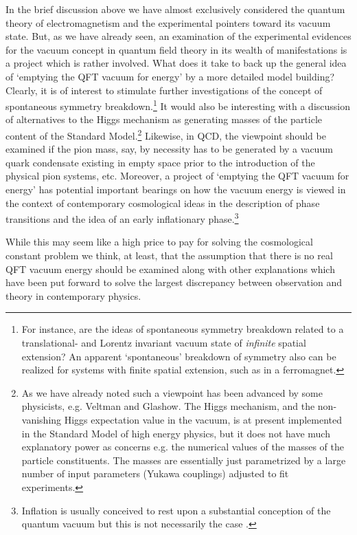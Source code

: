 \documentclass[12pt]{article}
\begin{document}
In the brief discussion above we have almost exclusively
considered the quantum theory of electromagnetism and the
experimental pointers toward its vacuum state. But, as we have
already seen, an examination of the experimental evidences for the
vacuum concept in quantum field theory in its wealth of
manifestations is a project which is rather involved. What does it
take to back up the general idea of `emptying the QFT vacuum for
energy' by a more detailed model building? Clearly, it is of
interest to stimulate further investigations of the concept of
spontaneous symmetry breakdown.\footnote{For instance, are the
ideas of spontaneous symmetry breakdown related to a
translational- and Lorentz invariant vacuum state of {\em
infinite} spatial extension? An apparent `spontaneous' breakdown
of symmetry also can be realized for systems with finite spatial
extension, such as in a ferromagnet.} It would also be interesting
with a discussion of alternatives to the Higgs mechanism as
generating masses of the particle content of the Standard
Model.\footnote{As we have already noted such a viewpoint has been
advanced by some physicists, e.g. Veltman and Glashow. The Higgs
mechanism, and the non-vanishing Higgs expectation value in the
vacuum, is at present implemented in the Standard Model of high
energy physics, but it does not have much explanatory power as
concerns e.g. the numerical values of the masses of the particle
constituents. The masses are essentially just parametrized by a
large number of input parameters (Yukawa couplings) adjusted to
fit experiments.} Likewise, in QCD, the viewpoint should be
examined if the pion mass, say, by necessity has to be generated
by a vacuum quark condensate existing in empty space prior to the
introduction of the physical pion systems, etc. Moreover, a
project of `emptying the QFT vacuum for energy' has potential
important bearings on how the vacuum energy is viewed in the
context of contemporary cosmological ideas in the description of
phase transitions and the idea of an early inflationary
phase.\footnote{Inflation is usually conceived to rest upon a
substantial conception of the quantum vacuum but this is not
necessarily the case \cite{brandenberger99,starobinsky80}.}

While this may seem like a high price to pay for solving the
cosmological constant problem we think, at least, that the
assumption that there is no real QFT vacuum energy should be
examined along with other explanations which have been put forward
to solve the largest discrepancy between observation and theory in
contemporary physics.
\end{document}
